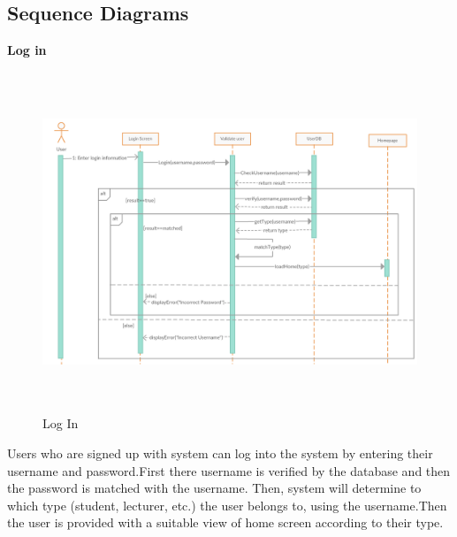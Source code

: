 \documentclass[a4paper,beamer]{article}
\begin{document}
	\subsection{Sequence Diagrams}
		\textbf{Log in}\newline
			
		\begin{figure}[h!]
			\begin{center}
			\includegraphics[width=6in,height=4in]{img/seq-login}
			\end{center}
			\caption{Log In}
			\label{fig:Log In}
		\end{figure}

		 Users who are signed up with system can log into the system by entering their username and password.First there username is verified by the database and then the password is matched with the username.\newline
		Then, system will determine to which type (student, lecturer, etc.) the user belongs to, using the username.Then  the user is provided with a suitable view of home screen according to their type.\newline

		\newpage
		
\end{document}
